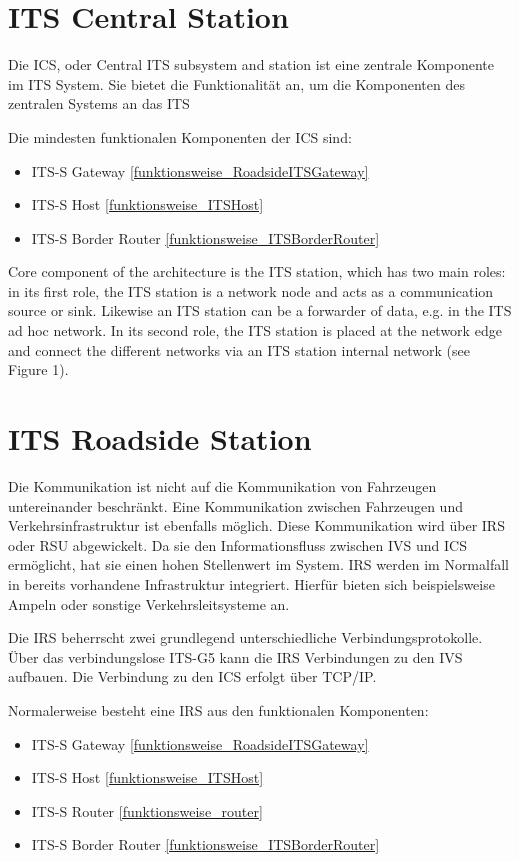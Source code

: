 \section{ITS Central Station}
Die \ac{ICS}, oder Central \ac{ITS} subsystem and station ist eine zentrale Komponente im \ac{ITS} System. Sie bietet die Funktionalität an, um die Komponenten des zentralen Systems an das \ac{ITS} 

Die mindesten funktionalen Komponenten der \ac{ICS} sind:
\begin{itemize}
	\item ITS-S Gateway \ref{funktionsweise_RoadsideITSGateway}
	\item ITS-S Host \ref{funktionsweise_ITSHost}
	\item ITS-S Border Router \ref{funktionsweise_ITSBorderRouter}
\end{itemize}


Core component of the architecture is the ITS station, which has two main roles: in its first role, the ITS station is a network node and acts as a communication source or sink. Likewise an ITS station can be a forwarder of data, e.g. in the ITS ad hoc network. In its second role, the ITS station is placed at the network edge and connect the different networks via an ITS station internal network (see Figure 1). \cite{etsi302636-3}

	
	
\section{ITS Roadside Station}
Die Kommunikation ist nicht auf die Kommunikation von Fahrzeugen untereinander beschränkt. Eine Kommunikation zwischen Fahrzeugen und Verkehrsinfrastruktur ist ebenfalls möglich. Diese Kommunikation wird über \ac{IRS} oder \ac{RSU} abgewickelt. Da sie den Informationsfluss zwischen \ac{IVS} und \ac{ICS} ermöglicht, hat sie einen hohen Stellenwert im System. \ac{IRS} werden im Normalfall in bereits vorhandene Infrastruktur integriert. Hierfür bieten sich beispielsweise Ampeln oder sonstige Verkehrsleitsysteme an. 

Die \ac{IRS} beherrscht zwei grundlegend unterschiedliche Verbindungsprotokolle. Über das verbindungslose ITS-G5 kann die \ac{IRS} Verbindungen zu den \ac{IVS} aufbauen. Die Verbindung zu den \ac{ICS} erfolgt über TCP/IP. 

Normalerweise besteht eine \ac{IRS} aus den funktionalen Komponenten: 
\begin{itemize}
	\item  ITS-S Gateway \ref{funktionsweise_RoadsideITSGateway}
	\item ITS-S Host \ref{funktionsweise_ITSHost}
	\item ITS-S Router \ref{funktionsweise_router}
	\item ITS-S Border Router \ref{funktionsweise_ITSBorderRouter}
\end{itemize}

